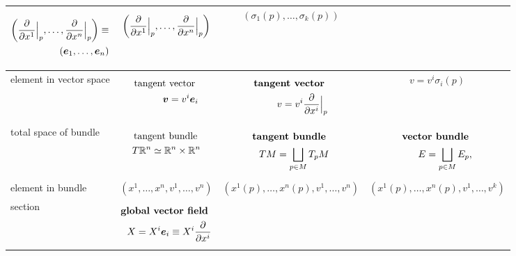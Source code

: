 \documentclass[11pt]{article}
\begin{document}
\begin{itemize}
\begin{table}[h!]
\begin{tabularx}{1\textwidth} { 
  | >{\raggedright\arraybackslash} m{2cm}
  | >{\centering\arraybackslash}X
  | >{\centering\arraybackslash}X
  | >{\centering\arraybackslash}X  | }
\begin{center}
 \begin{align*}
 \left(\dfrac{\partial}{\partial x^{1}}\Bigr|_{p}, \ldots, \dfrac{\partial}{\partial x^{n}}\Bigr|_{p}\right)  \equiv  \\
(\boldsymbol{e}_1, \ldots, \boldsymbol{e}_{n})
\end{align*} 
 \end{center} &  \begin{align*}
 \left(\dfrac{\partial}{\partial x^{1}}\Bigr|_{p}, \ldots, \dfrac{\partial}{\partial x^{n}}\Bigr|_{p}\right)
\end{align*} &   \begin{align*}
 (\sigma_1(p), \ldots, \sigma_{k}(p))
\end{align*} \\
\hline
element in vector space &  \begin{align*}
\text{tangent vector }\\
 \boldsymbol{v} = v^{i}\boldsymbol{e}_{i}
 \end{align*}  & \begin{align*} 
\text{\textbf{tangent vector} }\\
  v = v^{i}\dfrac{\partial}{\partial x^{i}}\Bigr|_{p}
 \end{align*}  & \begin{align*} 
 v = v^{i}\sigma_{i}(p)
 \end{align*}\\
\hline
total space of bundle & \begin{align*}
\text{tangent bundle }\\
 T{\mathbb R}^{n} \simeq  {\mathbb R}^{n} \times {\mathbb R}^{n}
 \end{align*}  & \begin{align*}
 \text{\textbf{tangent bundle} }\\
TM =  \bigsqcup_{p\in M}T_{p}M
 \end{align*} 
 & 
\begin{align*}
 \text{\textbf{vector bundle} }\\
E =  \bigsqcup_{p\in M}E_{p}, 
 \end{align*}\\
\hline
element in bundle & $(x^1,\ldots, x^{n}, v^1, \ldots, v^{n})$ &
$(x^1(p), \ldots, x^{n}(p),  v^1, \ldots, v^{n})$
& 
$(x^1(p), \ldots, x^{n}(p),  v^1, \ldots, v^{k})$ \\
\hline
section & 
\begin{align*}
\text{\textbf{global vector field} }\\
X = X^{i}\mb{e}_{i} \equiv X^{i}\partdiff{}{x^{i}}

\end{align*}
\end{tabularx}
\end{table}
\end{itemize}
\end{document}
